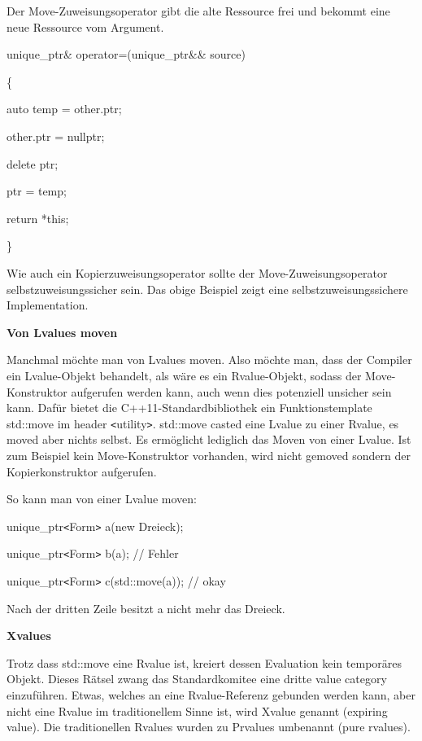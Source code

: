 \documentclass{article}
\begin{document}
Der Move-Zuweisungsoperator gibt die alte Ressource frei und bekommt eine neue 
Ressource vom Argument.

unique\_ptr\& operator=(unique\_ptr\&\& source)

\{    

\parindent=14pt
auto temp = other.ptr;    

other.ptr = nullptr;    

\parindent=28pt
delete ptr;    

\parindent=14pt
ptr = temp;    

\vspace{12pt}
return *this;

\}

\parindent=0pt
Wie auch ein Kopierzuweisungsoperator sollte der Move-Zuweisungsoperator selbstzuweisungssicher 
sein. Das obige Beispiel zeigt eine selbstzuweisungssichere Implementation.

\vspace{25pt}
\textbf{Von Lvalues moven}

Manchmal möchte man von Lvalues moven. Also möchte man, dass der Compiler ein 
Lvalue-Objekt behandelt, als wäre es ein Rvalue-Objekt, sodass der Move-Konstruktor 
aufgerufen werden kann, auch wenn dies potenziell unsicher sein kann. Dafür bietet 
die C++11-Standardbibliothek ein Funktionstemplate std::move im header \texttt{<}utility\texttt{>}. 
std::move casted eine Lvalue zu einer Rvalue, es moved aber nichts selbst. Es ermöglicht 
lediglich das Moven von einer Lvalue. Ist zum Beispiel kein Move-Konstruktor vorhanden, 
wird nicht gemoved sondern der Kopierkonstruktor aufgerufen.

So kann man von einer Lvalue moven:

unique\_ptr\texttt{<}Form\texttt{>} a(new Dreieck);

unique\_ptr\texttt{<}Form\texttt{>} b(a);            // Fehler

unique\_ptr\texttt{<}Form\texttt{>} c(std::move(a)); // okay

\vspace{12pt}
Nach der dritten Zeile besitzt a nicht mehr das Dreieck.

\vspace{12pt}
\textbf{Xvalues}

Trotz dass std::move eine Rvalue ist, kreiert dessen Evaluation kein temporäres 
Objekt. Dieses Rätsel zwang das Standardkomitee eine dritte value category einzuführen. 
Etwas, welches an eine Rvalue-Referenz gebunden werden kann, aber nicht eine Rvalue 
im traditionellem Sinne ist, wird Xvalue genannt (expiring value). Die traditionellen 
Rvalues wurden zu Prvalues umbenannt (pure rvalues).
\end{document}
